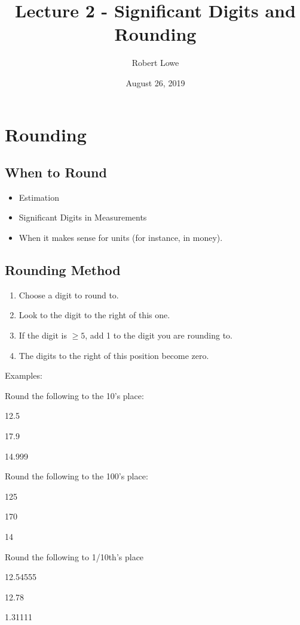 \documentclass{article}
\title{Lecture 2 - Significant Digits and Rounding}
\author{Robert Lowe}
\date{August 26, 2019}
\begin{document}
\maketitle

\section{Rounding}
\subsection{When to Round}
\begin{itemize}
    \item Estimation
    \item Significant Digits in Measurements
    \item When it makes sense for units (for instance, in money).
\end{itemize}

\subsection{Rounding Method}
\begin{enumerate}
    \item Choose a digit to round to.
    \item Look to the digit to the right of this one.
    \item If the digit is $\geq 5$, add 1 to the digit you are rounding to.
    \item The digits to the right of this position become zero.
\end{enumerate}
Examples:

Round the following to the 10's place:
\begin{enumerate*}[label=\ \ (\alph*)]
    \item 12.5 
    \item 17.9
    \item 14.999
\end{enumerate*}

Round the following to the 100's place:
\begin{enumerate*}[label=\ \ (\alph*)]
    \item 125
    \item 170
    \item 14
\end{enumerate*}

Round the following to 1/10th's place
\begin{enumerate*}[label=\ \ (\alph*)]
    \item 12.54555
    \item 12.78
    \item 1.31111
\end{enumerate*}
\end{document}
